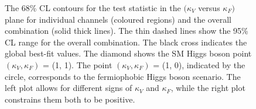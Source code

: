 \documentclass[12pt,twoside,a4paper,cmspaper,final,collab]{cms-tdr}
\begin{document}
\begin{figure}
\centering
{} \hfill
{}
\caption{
The 68\% CL contours for the test statistic in the $(\kappa_V$ versus
$\kappa_F)$ plane for individual channels (coloured regions) and the
overall combination (solid thick lines).
The thin dashed lines show the 95\% CL range for the overall combination.
The black cross indicates the global best-fit values. The diamond shows the SM Higgs boson
point $(\kappa_V, \kappa_F)$ = (1, 1).
The point $(\kappa_V, \kappa_F)$ = (1, 0), indicated by the circle, corresponds to the fermiophobic Higgs boson scenario.
The left plot allows for different signs of $\kappa_V$ and $\kappa_F$, while the
right plot constrains them both to be positive.
}
\label{fig:cVcF_subchannels}
\end{figure}
\end{document}
